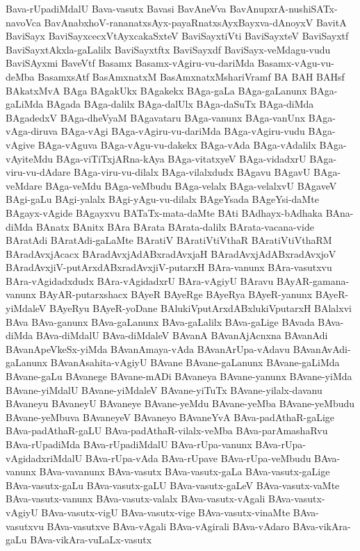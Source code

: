 {Bava-rUpadiMdalU
Bava-vasutx
Bavasi
BavAneVva
BavAnupxrA-nushiSATx-navoVca
BavAnabxhoV-rananatxsAyx-payaRnatxsAyxBayxva-dAnoyxV
BavitA
BaviSayx
BaviSayxcecxVtAyxcakaSxteV
BaviSayxtiVti
BaviSayxteV
BaviSayxtf
BaviSayxtAkxla-gaLalilx
BaviSayxtftx
BaviSayxdf
BaviSayx-veMdagu-vudu
BaviSAyxmi
BaveVtf
Basamx
Basamx-vAgiru-vu-dariMda
Basamx-vAgu-vu-deMba
BasamxsAtf
BasAmxnatxM
BasAmxnatxMshariVramf
BA
BAH
BAHsf
BAkatxMvA
BAga
BAgakUkx
BAgakekx
BAga-gaLa
BAga-gaLanunx
BAga-gaLiMda
BAgada
BAga-dalilx
BAga-dalUlx
BAga-daSuTx
BAga-diMda
BAgadedxV
BAga-dheVyaM
BAgavataru
BAga-vanunx
BAga-vanUnx
BAga-vAga-diruva
BAga-vAgi
BAga-vAgiru-vu-dariMda
BAga-vAgiru-vudu
BAga-vAgive
BAga-vAguva
BAga-vAgu-vu-dakekx
BAga-vAda
BAga-vAdalilx
BAga-vAyiteMdu
BAga-viTiTxjARna-kAya
BAga-vitatxyeV
BAga-vidadxrU
BAga-viru-vu-dAdare
BAga-viru-vu-dilalx
BAga-vilalxdudx
BAgavu
BAgavU
BAga-veMdare
BAga-veMdu
BAga-veMbudu
BAga-velalx
BAga-velalxvU
BAgaveV
BAgi-gaLu
BAgi-yalalx
BAgi-yAgu-vu-dilalx
BAgeYsada
BAgeYsi-daMte
BAgayx-vAgide
BAgayxvu
BATaTx-mata-daMte
BAti
BAdhayx-bAdhaka
BAna-diMda
BAnatx
BAnitx
BAra
BArata
BArata-dalilx
BArata-vacana-vide
BAratAdi
BAratAdi-gaLaMte
BAratiV
BAratiVtiVthaR
BAratiVtiVthaRM
BAradAvxjAcacx
BAradAvxjAdABxradAvxjaH
BAradAvxjAdABxradAvxjoV
BAradAvxjiV-putArxdABxradAvxjiV-putarxH
BAra-vanunx
BAra-vasutxvu
BAra-vAgidadxdudx
BAra-vAgidadxrU
BAra-vAgiyU
BAravu
BAyAR-gamana-vanunx
BAyAR-putarxshacx
BAyeR
BAyeRge
BAyeRya
BAyeR-yanunx
BAyeR-yiMdaleV
BAyeRyu
BAyeR-yoDane
BAlukiVputArxdABxlukiVputarxH
BAlalxvi
BAva
BAva-ganunx
BAva-gaLanunx
BAva-gaLalilx
BAva-gaLige
BAvada
BAva-diMda
BAva-diMdalU
BAva-diMdaleV
BAvanA
BAvanAjAcnxna
BAvanAdi
BAvanApeVkeSx-yiMda
BAvanAmaya-vAda
BAvanArUpa-vAdavu
BAvanAvAdi-gaLanunx
BAvanAsahita-vAgiyU
BAvane
BAvane-gaLanunx
BAvane-gaLiMda
BAvane-gaLu
BAvanege
BAvane-mADi
BAvaneya
BAvane-yanunx
BAvane-yiMda
BAvane-yiMdalU
BAvane-yiMdaleV
BAvane-yiTuTx
BAvane-yilalx-davanu
BAvaneyu
BAvaneyU
BAvaneye
BAvane-yeMdu
BAvane-yeMba
BAvane-yeMbudu
BAvane-yeMbuva
BAvaneyeV
BAvaneyo
BAvaneYvA
BAva-padAthaR-gaLige
BAva-padAthaR-gaLU
BAva-padAthaR-vilalx-veMba
BAva-parAmashaRvu
BAva-rUpadiMda
BAva-rUpadiMdalU
BAva-rUpa-vanunx
BAva-rUpa-vAgidadxriMdalU
BAva-rUpa-vAda
BAva-rUpave
BAva-rUpa-veMbudu
BAva-vanunx
BAva-vavanunx
BAva-vasutx
BAva-vasutx-gaLa
BAva-vasutx-gaLige
BAva-vasutx-gaLu
BAva-vasutx-gaLU
BAva-vasutx-gaLeV
BAva-vasutx-vaMte
BAva-vasutx-vanunx
BAva-vasutx-valalx
BAva-vasutx-vAgali
BAva-vasutx-vAgiyU
BAva-vasutx-vigU
BAva-vasutx-vige
BAva-vasutx-vinaMte
BAva-vasutxvu
BAva-vasutxve
BAva-vAgali
BAva-vAgirali
BAva-vAdaro
BAva-vikAra-gaLu
BAva-vikAra-vuLaLx-vasutx
}

